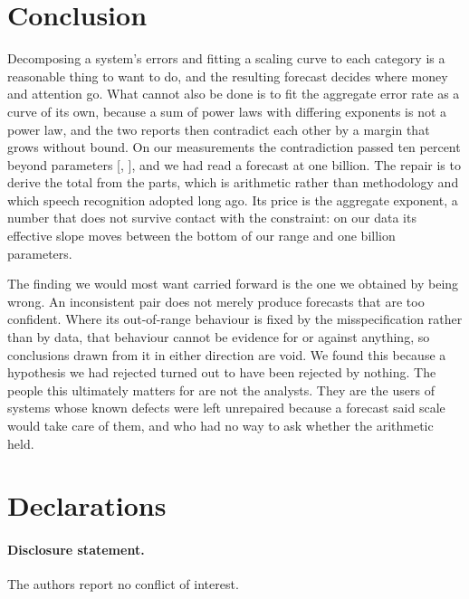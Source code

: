 \documentclass[11pt]{article}
\newif\ifanon
\begin{document}
\section{Conclusion}
\label{sec:conclusion}

Decomposing a system's errors and fitting a scaling curve to each category is a
reasonable thing to want to do, and the resulting forecast decides where money and
attention go. What cannot also be done is to fit the aggregate error rate as a curve
of its own, because a sum of power laws with differing exponents is not a power law,
and the two reports then contradict each other by a margin that grows without bound.
On our measurements the contradiction passed ten percent beyond
 parameters [, ],
and we had read a forecast at one billion. The repair is to derive the total from
the parts, which is arithmetic rather than methodology and which speech recognition
adopted long ago. Its price is the aggregate exponent, a number that does not
survive contact with the constraint: on our data its effective slope moves
 between the bottom of our range and one billion parameters.

The finding we would most want carried forward is the one we obtained by being
wrong. An inconsistent pair does not merely produce forecasts that are too
confident. Where its out-of-range behaviour is fixed by the misspecification rather
than by data, that behaviour cannot be evidence for or against anything, so
conclusions drawn from it in either direction are void. We found this because a
hypothesis we had rejected turned out to have been rejected by nothing. The people this ultimately matters for are not the analysts.
They are the users of systems whose known defects were left unrepaired because a
forecast said scale would take care of them, and who had no way to ask whether the
arithmetic held.

\section*{Declarations}

\paragraph{Disclosure statement.}
\ifanon
Removed for double-anonymous peer review.
\else
The authors report no conflict of interest.
\fi
\end{document}
